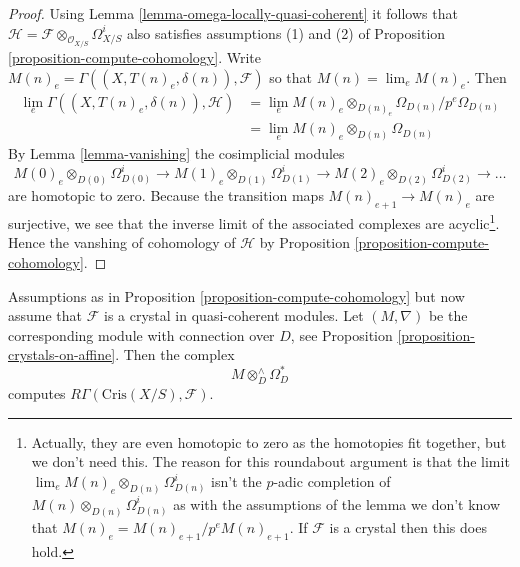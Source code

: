 \begin{proof}
Using Lemma \ref{lemma-omega-locally-quasi-coherent} it follows that
$\mathcal{H} = \mathcal{F} \otimes_{\mathcal{O}_{X/S}} \Omega^i_{X/S}$
also satisfies assumptions (1) and (2) of
Proposition \ref{proposition-compute-cohomology}.
Write $M(n)_e = \Gamma((X, T(n)_e, \delta(n)), \mathcal{F})$
so that $M(n) = \lim_e M(n)_e$. Then
\begin{align*}
\lim_e \Gamma((X, T(n)_e, \delta(n)), \mathcal{H}) & =
\lim_e M(n)_e \otimes_{D(n)_e} \Omega_{D(n)}/p^e\Omega_{D(n)} \\
& = \lim_e M(n)_e \otimes_{D(n)} \Omega_{D(n)}
\end{align*}
By
Lemma \ref{lemma-vanishing}
the cosimplicial modules
$$
M(0)_e \otimes_{D(0)} \Omega^i_{D(0)} \to
M(1)_e \otimes_{D(1)} \Omega^i_{D(1)} \to
M(2)_e \otimes_{D(2)} \Omega^i_{D(2)} \to \ldots
$$
are homotopic to zero. Because the transition maps
$M(n)_{e + 1} \to M(n)_e$ are surjective, we see that
the inverse limit of the associated complexes are acyclic\footnote{Actually,
they are even homotopic to zero as the homotopies fit together, but we don't
need this. The reason for this roundabout argument is that
the limit $\lim_e M(n)_e \otimes_{D(n)} \Omega^i_{D(n)}$ isn't the
$p$-adic completion of $M(n) \otimes_{D(n)} \Omega^i_{D(n)}$ as with
the assumptions of the lemma we don't know that
$M(n)_e = M(n)_{e + 1}/p^eM(n)_{e + 1}$. If $\mathcal{F}$ is a crystal
then this does hold.}.
Hence the vanshing of cohomology of $\mathcal{H}$ by
Proposition \ref{proposition-compute-cohomology}.
\end{proof}

\begin{proposition}
\label{proposition-compute-cohomology-crystal}
Assumptions as in Proposition \ref{proposition-compute-cohomology}
but now assume that $\mathcal{F}$ is a crystal in quasi-coherent modules.
Let $(M, \nabla)$ be the corresponding module with connection over $D$, see
Proposition \ref{proposition-crystals-on-affine}. Then the complex
$$
M \otimes^\wedge_D \Omega^*_D
$$
computes $R\Gamma(\text{Cris}(X/S), \mathcal{F})$.
\end{proposition}

